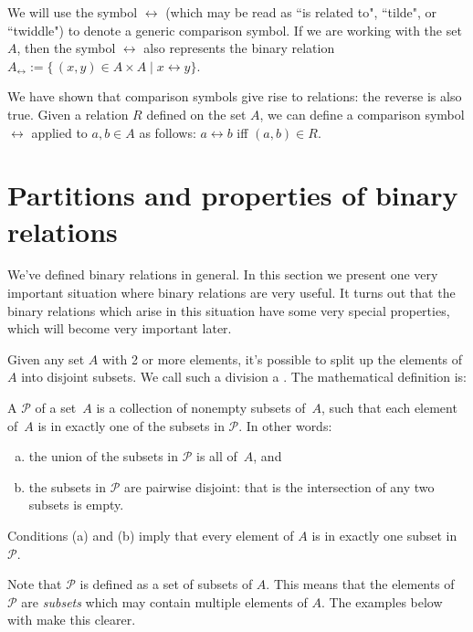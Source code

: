 We will use the symbol $\rel$ (which may be read as ``is related to", ``tilde", or ``twiddle") to denote a generic comparison symbol. If we are working with the set $A$, then the symbol $\rel$ also represents the binary relation $A_\rel := \{\, (x,y) \in A \times A \mid x \rel y \}$.

We have shown that comparison symbols give rise to relations: the reverse is also true. Given a relation $R$ defined on the set $A$, we can define a comparison symbol $\rel$ applied to $a,b \in A$ as follows:
$ a \rel b$ iff $(a,b) \in R$.

\section{Partitions and properties of binary relations  \quad{}} \label{Partitions1}

We've defined binary relations in general. In this section we present one very important situation where binary relations are very useful. It turns out that the binary relations which arise in this situation have some very special properties, which will become very important later.

Given any set $A$ with 2 or more elements, it's possible to split up the elements of $A$ into disjoint subsets. We call such a division a . The mathematical definition is:

\begin{defn}\label{def:Partition} A  $\mathcal{P}$ of a set~$A$ is a collection of nonempty subsets of~$A$, such that each element of~$A$ is in exactly one of the subsets in $\mathcal{P}$. In other words:
\begin{enumerate}[(a)]
\item the union of the subsets in $\mathcal{P}$ is all of~$A$,
and
\item the subsets in $\mathcal{P}$ are pairwise disjoint: that is the intersection of any two subsets is empty.
\end{enumerate}
Conditions (a) and (b) imply that every element of $A$ is in exactly one subset in $\mathcal{P}$.
\end{defn}

\begin{rem}
Note that $\mathcal{P}$ is defined as a set of subsets of $A$. This means that the elements of $\mathcal{P}$ are \emph{subsets} which may contain multiple elements of $A$. The examples below with make this clearer.
\end{rem}

